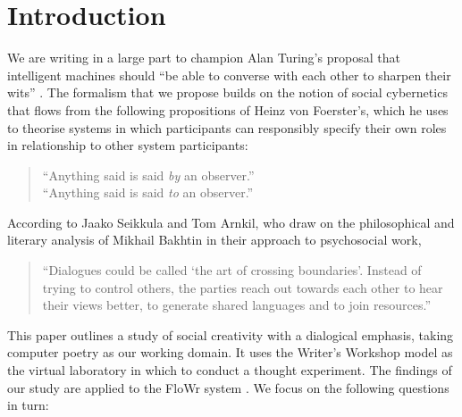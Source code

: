 \section{Introduction}
\label{sec:intro}


We are writing in a large part to champion Alan Turing's
proposal that intelligent machines should ``be able to converse with
each other to sharpen their wits'' \cite{turing-intelligent}. 
%
The formalism that we propose builds on the notion of social cybernetics that flows
from the following propositions of Heinz von Foerster's, which he uses to theorise systems
in which participants can responsibly specify their own roles in relationship to
other system participants:

\begin{quote}
``Anything said is said \emph{by} an observer.'' \\
``Anything said is said \emph{to} an observer.''\\
\end{quote}

According to Jaako Seikkula and Tom Arnkil, who draw on the philosophical and literary analysis of Mikhail Bakhtin \cite{bakhtin2010toward,bakhtin1984problems} in their approach to psychosocial work,
\begin{quote}
``Dialogues could be called `the art of crossing boundaries'.  Instead of trying to control others, the parties reach out towards each other to hear their views better, to generate shared languages and to join resources.''
\end{quote}

This paper outlines a study of social creativity with a dialogical emphasis, taking computer
poetry as our working domain.  It uses the Writer's Workshop model
\cite{gabriel2002writer} as the virtual laboratory in which to conduct a thought experiment.
The findings of our study are applied to the FloWr system \cite{charnley2014flowr}. 
We focus on the following questions in turn:


